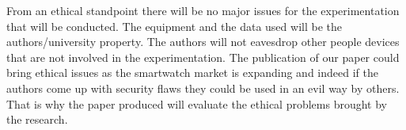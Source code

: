 From an ethical standpoint there will be no major issues for the experimentation that will be conducted. The equipment and the data used will be the authors/university property. The authors will not eavesdrop other people devices that are not involved in the experimentation.
The publication of our paper could bring ethical issues as the smartwatch market is expanding and indeed if the authors come up with security flaws they could be used in an evil way by others. That is why the paper produced will evaluate the ethical problems brought by the research.